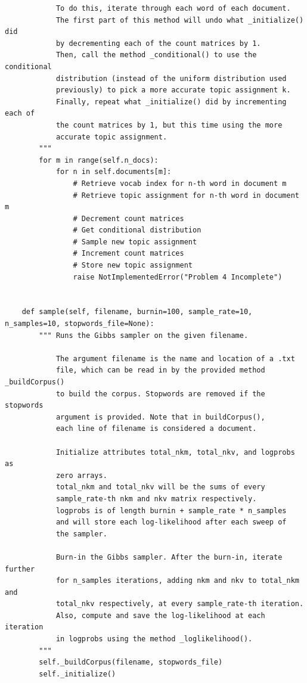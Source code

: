 \begin{lstlisting}
            To do this, iterate through each word of each document. 
            The first part of this method will undo what _initialize() did
            by decrementing each of the count matrices by 1.
            Then, call the method _conditional() to use the conditional 
            distribution (instead of the uniform distribution used 
            previously) to pick a more accurate topic assignment k.
            Finally, repeat what _initialize() did by incrementing each of
            the count matrices by 1, but this time using the more 
            accurate topic assignment.
        """
        for m in range(self.n_docs):
            for n in self.documents[m]:
                # Retrieve vocab index for n-th word in document m
                # Retrieve topic assignment for n-th word in document m
                # Decrement count matrices
                # Get conditional distribution
                # Sample new topic assignment
                # Increment count matrices
                # Store new topic assignment
                raise NotImplementedError("Problem 4 Incomplete")

                
    def sample(self, filename, burnin=100, sample_rate=10, n_samples=10, stopwords_file=None):
        """ Runs the Gibbs sampler on the given filename. 
        
            The argument filename is the name and location of a .txt 
            file, which can be read in by the provided method _buildCorpus()
            to build the corpus. Stopwords are removed if the stopwords
            argument is provided. Note that in buildCorpus(),
            each line of filename is considered a document.
            
            Initialize attributes total_nkm, total_nkv, and logprobs as
            zero arrays.
            total_nkm and total_nkv will be the sums of every 
            sample_rate-th nkm and nkv matrix respectively.
            logprobs is of length burnin + sample_rate * n_samples
            and will store each log-likelihood after each sweep of 
            the sampler.
            
            Burn-in the Gibbs sampler. After the burn-in, iterate further 
            for n_samples iterations, adding nkm and nkv to total_nkm and 
            total_nkv respectively, at every sample_rate-th iteration.
            Also, compute and save the log-likelihood at each iteration 
            in logprobs using the method _loglikelihood().
        """
        self._buildCorpus(filename, stopwords_file)
        self._initialize()
        

\end{lstlisting}
